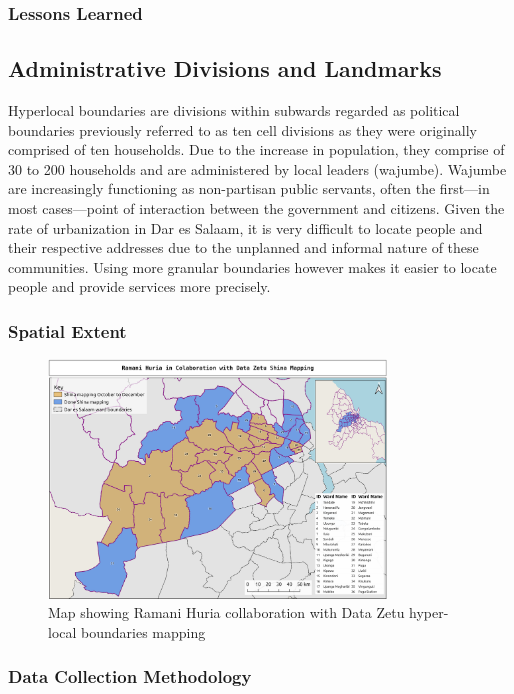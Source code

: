 \documentclass[a4paper,12pt,twoside]{article}
\begin{document}
\subsubsection{Lessons Learned}

\newpage
\subsection{Administrative Divisions and Landmarks}
Hyperlocal boundaries are divisions within subwards regarded as political boundaries previously referred to as ten cell divisions as they were originally comprised of ten households.
Due to the increase in population, they comprise of 30 to 200 households and are administered by local leaders (wajumbe). Wajumbe are increasingly functioning as non-partisan public servants, often the first---in most cases---point of interaction between the government and citizens.
Given the rate of urbanization in Dar es Salaam, it is very difficult to locate people and their respective addresses due to the unplanned and informal nature of these communities. Using more granular boundaries however makes it easier to locate people and provide services more precisely. 

\subsubsection{Spatial Extent}
\begin{figure}[h]
  \color{RHgreen}\caption{Map showing Ramani Huria collaboration with Data Zetu hyper-local boundaries mapping}
  \centering
  \includegraphics[width=0.8\textwidth]{images/RH_DZ_shina_boundaries.png}
\end{figure}

\subsubsection{Data Collection Methodology}
\end{document}
